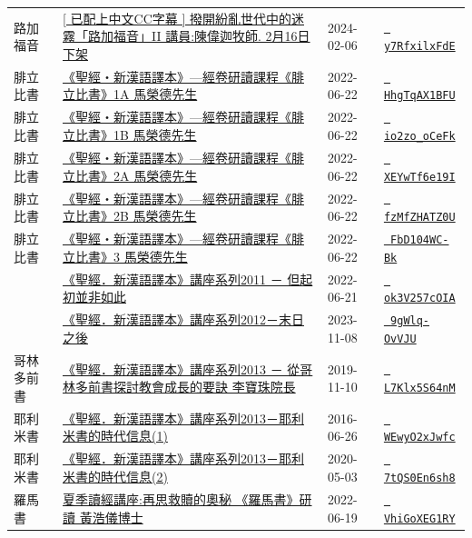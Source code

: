 \documentclass{book}
\begin{document}
{\begin{xltabular}{\textwidth}{|p{0.15\textwidth} p{0.6\textwidth}|p{0.07\textwidth} p{0.1\textwidth}|}
路加福音   & \hyperref[sec:y7RfxilxFdE]{[ 已配上中文CC字幕 ] 撥開紛亂世代中的迷霧「路加福音」II  講員:陳偉迦牧師. 2月16日下架} & 2024-02-06 & \href{https://youtube.com/watch?v=y7RfxilxFdE}{\texttt{ y7RfxilxFdE}} \\
腓立比書   & \hyperref[sec:HhgTqAX1BFU]{《聖經‧新漢語譯本》—經卷研讀課程《腓立比書》1A 馬榮德先生} & 2022-06-22 & \href{https://youtube.com/watch?v=HhgTqAX1BFU}{\texttt{ HhgTqAX1BFU}} \\
腓立比書   & \hyperref[sec:io2zo_oCeFk]{《聖經‧新漢語譯本》—經卷研讀課程《腓立比書》1B 馬榮德先生} & 2022-06-22 & \href{https://youtube.com/watch?v=io2zo_oCeFk}{\texttt{ io2zo\_oCeFk}} \\
腓立比書   & \hyperref[sec:XEYwTf6e19I]{《聖經‧新漢語譯本》—經卷研讀課程《腓立比書》2A 馬榮德先生} & 2022-06-22 & \href{https://youtube.com/watch?v=XEYwTf6e19I}{\texttt{ XEYwTf6e19I}} \\
腓立比書   & \hyperref[sec:fzMfZHATZ0U]{《聖經‧新漢語譯本》—經卷研讀課程《腓立比書》2B 馬榮德先生} & 2022-06-22 & \href{https://youtube.com/watch?v=fzMfZHATZ0U}{\texttt{ fzMfZHATZ0U}} \\
腓立比書   & \hyperref[sec:FbD104WC_Bk]{《聖經‧新漢語譯本》—經卷研讀課程《腓立比書》3 馬榮德先生} & 2022-06-22 & \href{https://youtube.com/watch?v=FbD104WC-Bk}{\texttt{ FbD104WC-Bk}} \\
    & \hyperref[sec:ok3V257cOIA]{《聖經．新漢語譯本》講座系列2011 － 但起初並非如此} & 2022-06-21 & \href{https://youtube.com/watch?v=ok3V257cOIA}{\texttt{ ok3V257cOIA}} \\
    & \hyperref[sec:9gWlq_OvVJU]{《聖經．新漢語譯本》講座系列2012－末日之後} & 2023-11-08 & \href{https://youtube.com/watch?v=9gWlq-OvVJU}{\texttt{ 9gWlq-OvVJU}} \\
哥林多前書   & \hyperref[sec:L7Klx5S64nM]{《聖經．新漢語譯本》講座系列2013 － 從哥林多前書探討教會成長的要訣 李寶珠院長} & 2019-11-10 & \href{https://youtube.com/watch?v=L7Klx5S64nM}{\texttt{ L7Klx5S64nM}} \\
耶利米書   & \hyperref[sec:WEwyO2xJwfc]{《聖經．新漢語譯本》講座系列2013－耶利米書的時代信息(1)} & 2016-06-26 & \href{https://youtube.com/watch?v=WEwyO2xJwfc}{\texttt{ WEwyO2xJwfc}} \\
耶利米書   & \hyperref[sec:7tQS0En6sh8]{《聖經．新漢語譯本》講座系列2013－耶利米書的時代信息(2)} & 2020-05-03 & \href{https://youtube.com/watch?v=7tQS0En6sh8}{\texttt{ 7tQS0En6sh8}} \\
羅馬書   & \hyperref[sec:VhiGoXEG1RY]{夏季讀經講座:再思救贖的奧秘 《羅馬書》研讀 黃浩儀博士} & 2022-06-19 & \href{https://youtube.com/watch?v=VhiGoXEG1RY}{\texttt{ VhiGoXEG1RY}} \\

\end{xltabular}}
\end{document}

